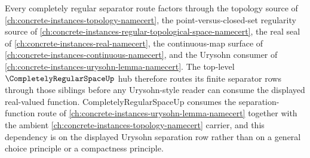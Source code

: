 Every completely regular separator route factors through the topology source of \autoref{ch:concrete-instances-topology-namecert}, the point-versus-closed-set regularity source of \autoref{ch:concrete-instances-regular-topological-space-namecert}, the real seal of \autoref{ch:concrete-instances-real-namecert}, the continuous-map surface of \autoref{ch:concrete-instances-continuous-namecert}, and the Urysohn consumer of \autoref{ch:concrete-instances-urysohn-lemma-namecert}. The top-level $\CompletelyRegularSpaceUp$ hub therefore routes its finite separator rows through those siblings before any Urysohn-style reader can consume the displayed real-valued function. CompletelyRegularSpaceUp consumes the separation-function route of \autoref{ch:concrete-instances-urysohn-lemma-namecert} together with the ambient \autoref{ch:concrete-instances-topology-namecert} carrier, and this dependency is on the displayed Urysohn separation row rather than on a general choice principle or a compactness principle.
